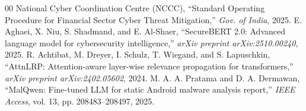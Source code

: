 \documentclass[conference]{IEEEtran}
\begin{document}
\begin{thebibliography}{00}
 National Cyber Coordination Centre (NCCC), ``Standard Operating Procedure for Financial Sector Cyber Threat Mitigation,'' \textit{Gov. of India}, 2025.
 E. Aghaei, X. Niu, S. Shadmand, and E. Al-Shaer, ``SecureBERT 2.0: Advanced language model for cybersecurity intelligence,'' \textit{arXiv preprint arXiv:2510.00240}, 2025.
 R. Achtibat, M. Dreyer, I. Schulz, T. Wiegand, and S. Lapuschkin, ``AttnLRP: Attention-aware layer-wise relevance propagation for transformers,'' \textit{arXiv preprint arXiv:2402.05602}, 2024.
 M. A. A. Pratama and D. A. Dermawan, ``MalQwen: Fine-tuned LLM for static Android malware analysis report,'' \textit{IEEE Access}, vol. 13, pp. 208483--208497, 2025.
\end{thebibliography}
\end{document}
